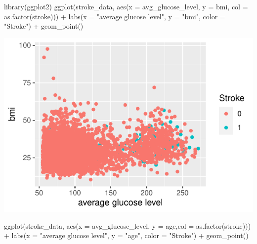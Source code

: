 \documentclass[
]{article}
\newenvironment{Shaded}{\begin{snugshade}}{\end{snugshade}}
\newcommand{\AttributeTok}[1]{\textcolor[rgb]{0.77,0.63,0.00}{#1}}
\newcommand{\FunctionTok}[1]{\textcolor[rgb]{0.00,0.00,0.00}{#1}}
\newcommand{\NormalTok}[1]{#1}
\newcommand{\SpecialCharTok}[1]{\textcolor[rgb]{0.00,0.00,0.00}{#1}}
\newcommand{\StringTok}[1]{\textcolor[rgb]{0.31,0.60,0.02}{#1}}
\begin{document}
\begin{Shaded}
\begin{Highlighting}[]
\FunctionTok{library}\NormalTok{(ggplot2)}
\FunctionTok{ggplot}\NormalTok{(stroke\_data, }\FunctionTok{aes}\NormalTok{(}\AttributeTok{x =}\NormalTok{ avg\_glucose\_level, }\AttributeTok{y =}\NormalTok{ bmi, }\AttributeTok{col =} \FunctionTok{as.factor}\NormalTok{(stroke))) }\SpecialCharTok{+}
  \FunctionTok{labs}\NormalTok{(}\AttributeTok{x =} \StringTok{"average glucose level"}\NormalTok{, }\AttributeTok{y =} \StringTok{"bmi"}\NormalTok{, }\AttributeTok{color =} \StringTok{"Stroke"}\NormalTok{) }\SpecialCharTok{+} \FunctionTok{geom\_point}\NormalTok{()}
\end{Highlighting}
\end{Shaded}

\begin{center}\includegraphics{stat-project-stroke_files/figure-latex/unnamed-chunk-11-1} \end{center}

\begin{Shaded}
\begin{Highlighting}[]
\FunctionTok{ggplot}\NormalTok{(stroke\_data, }\FunctionTok{aes}\NormalTok{(}\AttributeTok{x =}\NormalTok{ avg\_glucose\_level, }\AttributeTok{y =}\NormalTok{ age,}\AttributeTok{col =} \FunctionTok{as.factor}\NormalTok{(stroke))) }\SpecialCharTok{+} 
  \FunctionTok{labs}\NormalTok{(}\AttributeTok{x =} \StringTok{"average glucose level"}\NormalTok{, }\AttributeTok{y =} \StringTok{"age"}\NormalTok{, }\AttributeTok{color =} \StringTok{"Stroke"}\NormalTok{) }\SpecialCharTok{+} \FunctionTok{geom\_point}\NormalTok{()}
\end{Highlighting}
\end{Shaded}
\end{document}
